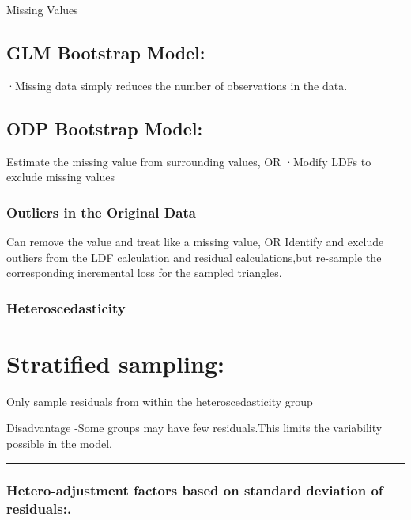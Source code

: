 \documentclass[
]{article}
\begin{document}
Missing Values

\subsection{GLM Bootstrap Model:}\label{glm-bootstrap-model-1}

·Missing data simply reduces the number of observations in the data.

\subsection{ODP Bootstrap Model:}\label{odp-bootstrap-model-1}

Estimate the missing value from surrounding values, OR ·Modify LDFs to
exclude missing values

\subsubsection{Outliers in the Original
Data}\label{outliers-in-the-original-data}

Can remove the value and treat like a missing value, OR Identify and
exclude outliers from the LDF calculation and residual calculations,but
re-sample the corresponding incremental loss for the sampled triangles.

\subsubsection{Heteroscedasticity}\label{heteroscedasticity}

\section{Stratified sampling:}\label{stratified-sampling}

Only sample residuals from within the heteroscedasticity group

Disadvantage -Some groups may have few residuals.This limits the
variability possible in the model.

\begin{center}\rule{0.5\linewidth}{0.5pt}\end{center}

\subsubsection{Hetero-adjustment factors based on standard deviation of
residuals:.}\label{hetero-adjustment-factors-based-on-standard-deviation-of-residuals.}
\end{document}
